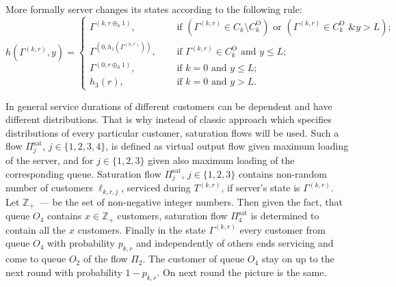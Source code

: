\documentclass[10pt]{article}
\begin{document}
More formally server changes its states according to the following rule:
\begin{equation}
h(\Gamma^{(k,r)},y) = 
\begin{cases}
\Gamma^{(k,r \oplus_k 1)},& \quad \text{ if } (\Gamma^{(k,r)}\in C_k\setminus C_k^{\mathrm{O}}) \text{ or } (\Gamma^{(k,r)}\in C_k^{\mathrm{O}} \text{ \& } y>L);\\
\Gamma^{(0,h_1(\Gamma^{(k,r)}))},& \quad \text{ if } \Gamma^{(k,r)}\in C_k^{\mathrm{O}} \text{ and } y\leqslant L;\\
\Gamma^{(0,r \oplus_0 1)},& \quad \text{ if } k=0 \text{ and } y\leqslant L;\\
h_3(r),& \quad \text{ if } k=0 \text{ and } y > L.
\end{cases}
\label{hLaw}
\end{equation}

In general service durations of different customers can be dependent and have different distributions. That is why instead of classic approach  which specifies distributions of every particular customer, saturation flows will be used. Such a flow $\Pi^{\mathrm{\text{sat}}}_j$, $j \in \{1,2,3,4\}$, 
is defined as virtual output flow given maximum loading of the server, and for $j\in \{1, 2, 3\}$ given also maximum loading of the corresponding queue. Saturation flow $\Pi^{\mathrm{\text{sat}}}_j$, $j\in \{1,2,3\}$ 
contains non-random number of customers $\ell_{k,r,j}$, serviced during $T^{(k,r)}$, if server's state is $\Gamma^{(k,r)}$. Let $\mathbb{Z}_+$~--- be the set of non-negative integer numbers. Then given the fact, that queue $O_4$ contains $x \in \mathbb{Z}_+$ customers, saturation flow $\Pi^{\mathrm{\text{sat}}}_4$ is determined to contain all the $x$ customers.
Finally in the state $\Gamma^{(k,r)}$ every customer from queue $O_4$ with probability $p_{k,r}$ and independently of others ends servicing and come to queue $O_2$ of the flow $\Pi_2$. The customer of queue $O_4$ stay on up to the next round with probability $1-p_{k,r}$. On next round the picture is the same.
\end{document}
